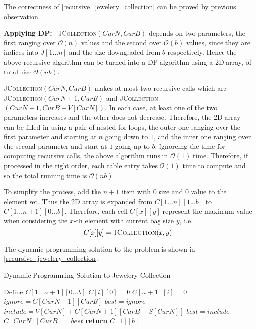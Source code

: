 \begin{homeworkProblem}
The correctness of \cref{recursive_jewelery_collection} can be proved by 
previous observation.

\vspace{1em}
\noindent
\textbf{Applying DP:\ }
\textsc{JCollection}$(CurN, CurB)$ depends on two parameters, the first
ranging over $\mathcal{O}(n)$ values and the second over $\mathcal{O}(b)$
values, since they are indices into $J[1\ldots n]$ and the size downgraded
from $b$ respectively. Hence the above recursive algorithm can be turned
into a DP algorithm using a 2D array, of total size $\mathcal{O}(nb)$.

\textsc{JCollection}$(CurN, CurB)$ makes at most two recursive calls 
which are \textsc{JCollection}$(CurN+1, CurB)$ and
\textsc{JCollection}$(CurN+1, CurB-V[CurN])$.
In each case, at least one of the two parameters increases and the
other does not decrease. Therefore, the 2D array can be filled in
using a pair of nested for loops, the outer one ranging over the
first parameter and starting at $n$ going down to $1$, and the inner
one ranging over the second parameter and start at $1$ going up
to $b$. Ignoreing the time for computing recursive calls, the above
algorithm runs in $\mathcal{O}(1)$ time. Therefore, if processed
in the right order, each table entry takes $\mathcal{O}(1)$ time to
compute and so the total running time is $\mathcal{O}(nb)$.

To simplify the process, add the $n+1$ item with $0$ size and $0$ value
to the element set. Thus the 2D array is expanded from $C[1\ldots n][1\ldots b]$ to $C[1\ldots n+1][0\ldots b]$.
Therefore, each cell $C[x][y]$ represent the maximum value when considering the
$x$-th element with current bag size $y$, i.e. 
\[C[x][y] = \text{\textsc{JCollection}}(x,y)\]

The dynamic programming solution to the problem is shown in \cref{recursive_jewelery_collection}.

\begin{algorithm}[H]
    \caption{Dynamic Programming Solution to Jewelery Collection}\label{dp_jewelery_collection}
    \begin{algorithmic}[1]
            \State Define $C[1\ldots n+1][0\ldots b]$
                \State $C[i][0] = 0$
            \EndFor
                \State $C[n+1][i] = 0$
            \EndFor
                    \State $ignore = C[CurN+1][CurB]$
                    \State $best = ignore$
                        \State $include = V[CurN] + C[CurN+1][CurB-S[CurN]]$
                            \State $best = include$
                        \EndIf
                    \EndIf
                    \State $C[CurN][CurB] = best$
                \EndFor
            \EndFor
            \State \textbf{return }$C[1][b]$
        \EndProcedure
    \end{algorithmic}
\end{algorithm}


\end{homeworkProblem}
